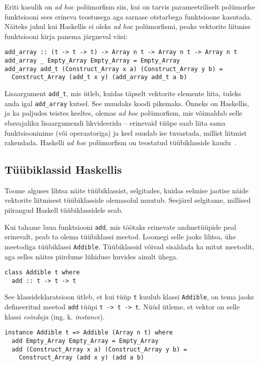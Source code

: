 \documentclass[12pt]{article}
\begin{document}
      Eriti kasulik on \textit{ad hoc} polümorfism siis, kui on tarvis parameetriliselt polümorfse funktsiooni sees erineva teostusega aga sarnase otstarbega funktsioone kasutada. Näiteks juhul kui Haskellis ei oleks \textit{ad hoc} polümorfismi, peaks vektorite liitmise funktsiooni kirja panema järgneval viisi:

      \begin{verbatim}add_array :: (t -> t -> t) -> Array n t -> Array n t -> Array n t
add_array _ Empty_Array Empty_Array = Empty_Array
add_array add_t (Construct_Array x a) (Construct_Array y b) =
  Construct_Array (add_t x y) (add_array add_t a b)\end{verbatim}

    Lisaargument \verb!add_t!, mis ütleb, kuidas täpselt vektorite elemente liita, tuleks anda igal \verb!add_array! kutsel. See muudaks koodi pikemaks. Õnneks on Haskellis, ja ka paljudes teistes keeltes, olemas \textit{ad hoc} polümorfism, mis võimaldab selle ebavajaliku lisaargumendi likvideerida -- erinevaid tüüpe saab liita sama funktsiooninime (või operaatoriga) ja keel suudab ise tuvastada, millist liitmist rakendada. Haskelli \textit{ad hoc} polümorfism on teostatud tüübiklasside kaudu~\cite{How}.
    \subsection{Tüübiklassid Haskellis}\label{haskklass}
      Toome alguses lihtsa näite tüübiklassist, selgitades, kuidas eelmise jaotise näide vektorite liitmisest tüübiklasside olemasolul muutub. Seejärel selgitame, millised piirangud Haskell tüübiklassidele seab.

      Kui tahame luua funktsiooni \verb!add!, mis töötaks erinevate andmetüüpide peal erinevalt, peab ta olema tüübiklassi meetod. Loomegi selle jaoks lihtsa, ühe meetodiga tüübiklassi \verb!Addible!. Tüübiklassid võivad sisaldada ka mitut meetodit, aga selles näites piirdume lühiduse huvides ainult ühega.

      \begin{verbatim}class Addible t where
  add :: t -> t -> t\end{verbatim}

      See klassideklaratsioon ütleb, et kui tüüp \verb!t! kuulub klassi \verb!Addible!, on tema jaoks defineeritud meetod \verb!add! tüüpi \verb!t -> t -> t!. Nüüd ütleme, et vektor on selle klassi \textit{esindaja} (ing. k. \textit{instance}).

      \begin{verbatim}instance Addible t => Addible (Array n t) where
  add Empty_Array Empty_Array = Empty_Array
  add (Construct_Array x a) (Construct_Array y b) =
    Construct_Array (add x y) (add a b)\end{verbatim}
\end{document}
